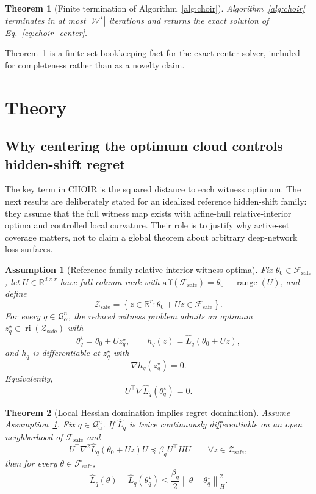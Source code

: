 \documentclass{article}
\newtheorem{theorem}{Theorem}
\newtheorem{assumption}{Assumption}
\newcommand{\RR}{\mathbb{R}}
\newcommand{\cF}{\mathcal{F}}
\newcommand{\cQ}{\mathcal{Q}}
\newcommand{\cW}{\mathcal{W}}
\newcommand{\cZ}{\mathcal{Z}}
\newcommand{\aff}{\mathrm{aff}}
\newcommand{\ri}{\operatorname{ri}}
\newcommand{\choir}{\textup{\textsc{CHOIR}}}
\newcommand{\norm}[1]{\left\lVert #1 \right\rVert}
\newcommand{\abs}[1]{\left\lvert #1 \right\rvert}
\newcommand{\braces}[1]{\left\{ #1 \right\}}
\newcommand{\safe}{\mathrm{safe}}
\begin{document}
\begin{theorem}[Finite termination of Algorithm~\ref{alg:choir}]
\label{thm:finite_termination}
Algorithm~\ref{alg:choir} terminates in at most \(\abs{\cW^\star}\) iterations and returns the exact solution of Eq.~\eqref{eq:choir_center}.
\end{theorem}

Theorem~\ref{thm:finite_termination} is a finite-set bookkeeping fact for the exact center solver, included for completeness rather than as a novelty claim.

\section{Theory}
\label{sec:theory}

\subsection{Why centering the optimum cloud controls hidden-shift regret}

The key term in \choir{} is the squared distance to each witness optimum. The next results are deliberately stated for an idealized reference hidden-shift family: they assume that the full witness map exists with affine-hull relative-interior optima and controlled local curvature. Their role is to justify why active-set coverage matters, not to claim a global theorem about arbitrary deep-network loss surfaces.

\begin{assumption}[Reference-family relative-interior witness optima]
\label{ass:interior}
Fix \(\theta_0\in\cF_{\safe}\), let \(U\in\RR^{d\times r}\) have full column rank with \(\aff(\cF_{\safe})=\theta_0+\operatorname{range}(U)\), and define
\[
\cZ_{\safe}
=
\braces{z\in\RR^r : \theta_0 + Uz \in \cF_{\safe}}.
\]
For every \(q\in\cQ_\alpha^n\), the reduced witness problem admits an optimum \(z_q^\star\in\ri(\cZ_{\safe})\) with
\[
\theta_q^\star = \theta_0 + U z_q^\star,
\qquad
h_q(z)=\widehat L_q(\theta_0+Uz),
\]
and \(h_q\) is differentiable at \(z_q^\star\) with
\[
\nabla h_q(z_q^\star)=0.
\]
Equivalently,
\[
U^\top \nabla \widehat L_q(\theta_q^\star)=0.
\]
\end{assumption}

\begin{theorem}[Local Hessian domination implies regret domination]
\label{thm:regret_domination}
Assume Assumption~\ref{ass:interior}. Fix \(q\in\cQ_\alpha^n\). If \(\widehat L_q\) is twice continuously differentiable on an open neighborhood of \(\cF_{\safe}\) and
\begin{equation}
U^\top \nabla^2 \widehat L_q(\theta_0+Uz) U \preceq \beta_q U^\top H U
\qquad
\forall z\in\cZ_{\safe},
\label{eq:hessian_domination}
\end{equation}
then for every \(\theta\in\cF_{\safe}\),
\begin{equation}
\widehat L_q(\theta)-\widehat L_q(\theta_q^\star)
\le
\frac{\beta_q}{2}\norm{\theta-\theta_q^\star}_{H}^{2}.
\label{eq:regret_domination}
\end{equation}
\end{theorem}
\end{document}
